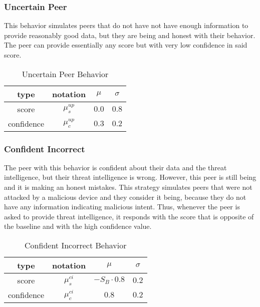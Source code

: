 \subsubsection{Uncertain Peer}
\label{subsubsec:uncertain-peer}
This behavior simulates peers that do not have not have enough information to provide reasonably good data, but they are being and honest with their behavior.
The peer can provide essentially any score but with very low confidence in said score.

\begin{table}[!ht]
    \centering
    \begin{tabular}{c|c|c|c}
        type & notation & $\mu$ & $\sigma$ \\
        \hline
        score & $\mu^{up}_{s}$ & $0.0$ & $0.8$ \\
        confidence & $\mu^{up}_{c}$ &  $0.3$ & $0.2$ \\
    \end{tabular}
    \caption{Uncertain Peer Behavior}
    \label{tab:uncertain-peer}
\end{table}

\subsubsection{Confident Incorrect}
\label{subsubsec:confident-incorrect-peer}
The peer with this behavior is confident about their data and the threat intelligence, but their threat intelligence is wrong.
However, this peer is still being and it is making an honest mistakes.
This strategy simulates peers that were not attacked by a malicious device and they consider it being, because they do not have any information indicating malicious intent.
Thus, whenever the peer is asked to provide threat intelligence, it responds with the score that is opposite of the baseline and with the high confidence value.

\begin{table}[!ht]
    \centering
    \begin{tabular}{c|c|c|c}
        type & notation & $\mu$ & $\sigma$ \\
        \hline
        score & $\mu^{ci}_{s}$ & $-S_{B} \cdot 0.8$ & $0.2$ \\
        confidence & $\mu^{ci}_{c}$ &  $0.8$ & $0.2$ \\
    \end{tabular}
    \caption{Confident Incorrect Behavior}
    \label{tab:confident-incorrect}
\end{table}


